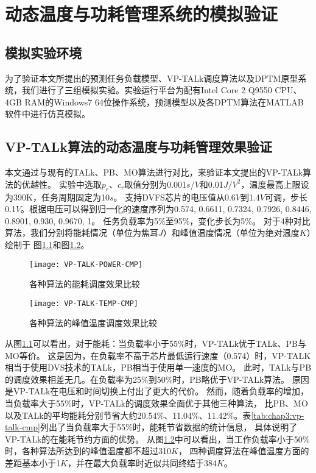 


\chapter{动态温度与功耗管理系统的模拟验证}
\label{cha:DPTMexperiments}

\section{模拟实验环境}
为了验证本文所提出的预测任务负载模型、VP-TALk调度算法以及DPTM原型系统，我们进行了三组模拟实验。实验运行平台为配有Intel Core 2 Q9550 CPU、4GB RAM的Windows7 64位操作系统，预测模型以及各DPTM算法在MATLAB软件中进行仿真模拟。

\section{VP-TALk算法的动态温度与功耗管理效果验证}
本文通过与现有的TALk、PB、MO算法进行对比，来验证本文提出的VP-TALk算法的优越性。 实验中选取$p_r$、$c_r$取值分别为0.001$s$/$V$和0.01$J$/$V^2$，温度最高上限设为390K，任务周期固定为10$s$。 支持DVFS芯片的电压值从0.6$V$到1.4$V$可调，步长0.1$V$。根据电压可以得到归一化的速度序列为{0.574, 0.6611, 0.7324, 0.7926, 0.8446, 0.8901, 0.930, 0.9670, 1}。 任务负载率为5\%至95\%，变化步长为5\%。 对于4种对比算法，我们分别将能耗情况（单位为焦耳$J$）和峰值温度情况（单位为绝对温度$K$）绘制于 图\ref{fig:vp-talk-power-cmp}和图\ref{fig:vp-talk-temp-cmp}。
\begin{figure}[H]
  \centering
  \texttt{[image: VP-TALK-POWER-CMP]}
  \caption{各种算法的能耗调度效果比较}
  \label{fig:vp-talk-power-cmp}
\end{figure}
\begin{figure}[H]
  \centering
  \texttt{[image: VP-TALK-TEMP-CMP]}
  \caption{各种算法的峰值温度调度效果比较}
  \label{fig:vp-talk-temp-cmp}
\end{figure}
从图\ref{fig:vp-talk-power-cmp}可以看出，对于能耗：当负载率小于55\%时，VP-TALk优于TALk、PB与MO等价。 这是因为，在负载率不高于芯片最低运行速度（0.574）时，VP-TALK相当于使用DVS技术的TALk，PB相当于使用单一速度的MO。 此时，TALk与PB的调度效果相差无几。在负载率为25\%到50\%时，PB略优于VP-TALk算法。 原因是VP-TALk在电压和时间切换上付出了更大的代价。 然而，随着负载率的增加，当负载率大于55\%时，VP-TALk的调度效果全面优于其他三种算法， 比PB、MO以及TALk的平均能耗分别节省大约20.54\%、11.04\%、11.42\%。表\ref{tab:chap3:vp-talk-cmp}列出了当负载率大于55\%时，能耗节省数据的统计信息， 具体说明了VP-TALk的在能耗节约方面的优势。
从图\ref{fig:vp-talk-temp-cmp}中可以看出，当工作负载率小于50\%时，各种算法所达到的峰值温度都不超过310$K$， 四种调度算法在峰值温度方面的差距基本小于1$K$，并在最大负载率时近似共同终结于384$K$。

